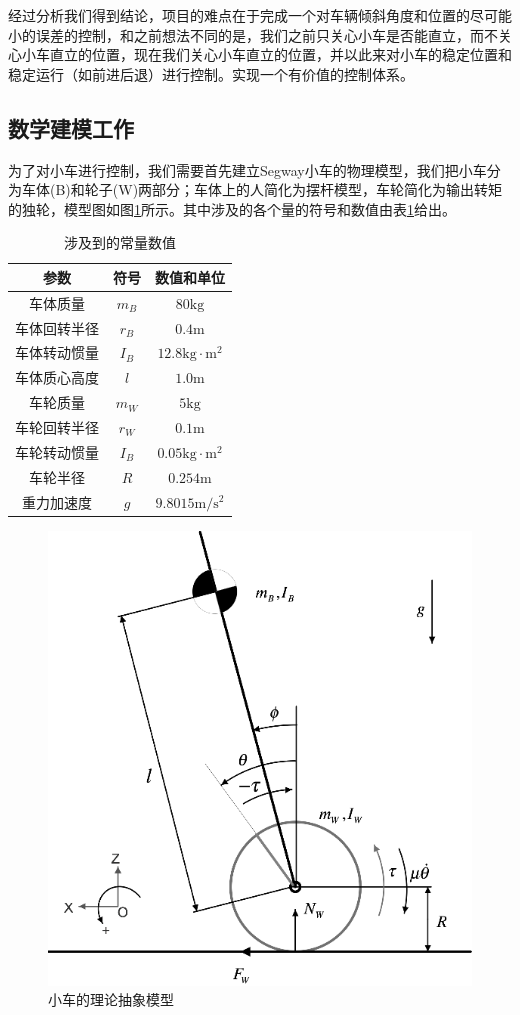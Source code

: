 \documentclass[UTF8,a4paper]{paper}
\begin{document}
经过分析我们得到结论，项目的难点在于完成一个对车辆倾斜角度和位置的尽可能小的误差的控制，和之前想法不同的是，我们之前只关心小车是否能直立，而不关心小车直立的位置，现在我们关心小车直立的位置，并以此来对小车的稳定位置和稳定运行（如前进后退）进行控制。实现一个有价值的控制体系。

\subsection{数学建模工作}
为了对小车进行控制，我们需要首先建立Segway小车的物理模型，我们把小车分为车体(B)和轮子(W)两部分；车体上的人简化为摆杆模型，车轮简化为输出转矩的独轮，模型图如图\ref{1}所示。其中涉及的各个量的符号和数值由表\ref{t1}给出。
\begin{table}\centering
\caption{涉及到的常量数值}\label{t1}
\begin{tabular}{|c|c|c|}\hline
参数 & 符号 & 数值和单位 \\ \hline
车体质量 & $m_B$ &$80\mathrm{kg}$ \\ \hline
车体回转半径 & $r_B$ &$0.4\mathrm{m}$\\ \hline
车体转动惯量&$I_B$&$12.8\mathrm{kg\cdot m^2}$\\ \hline
车体质心高度 & $l$ &$1.0\mathrm{m}$\\ \hline
车轮质量 & $m_W$ &$5\mathrm{kg}$\\ \hline
车轮回转半径 & $r_W$ &$0.1\mathrm{m}$\\ \hline
车轮转动惯量&$I_B$&$0.05\mathrm{kg\cdot m^2}$\\ \hline
车轮半径&$R$&$0.254\mathrm{m}$\\ \hline
重力加速度&$g$&$9.8015\mathrm{m/s^2}$ \\ \hline
\end{tabular}\end{table}
\begin{figure}\centering
\includegraphics[width=\columnwidth]{1.png}
\caption{小车的理论抽象模型}
\label{1}
\end{figure}
\end{document}
